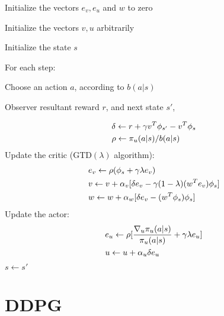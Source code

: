\documentclass[11pt,a4paper]{article}
\begin{document}
\begin{tcolorbox}[title=Off-PAC algorithm]
Initialize the vectors $e_v,e_u$ and $w$ to zero\par 
Initialize the vectors $v, u$ arbitrarily \par 
Initialize the state $s$ \par 
For each step: \par 
\hspace{1cm} Choose an action $a$, according to $b(a|s)$ \par 
\hspace{1cm} Observer resultant reward $r$, and next state $s'$, \par 
\begin{equation*}
\aligned 
& \delta \leftarrow r + \gamma v^T\phi_{s'} - v^T\phi_s \\ 
& \rho \leftarrow \pi_{u}(a|s)/b(a|s)
\endaligned
\end{equation*}
\hspace{1cm} Update the critic (GTD$(\lambda)$ algorithm):
\hspace{2cm}
\begin{equation*}
\aligned 
& e_v \leftarrow \rho(\phi_s + \gamma \lambda e_v) \\ 
& v \leftarrow v + \alpha_v [\delta e_v - \gamma(1-\lambda)(w^Te_v)\phi_s] \\ 
& w \leftarrow w + \alpha_w[\delta e_v - (w^T\phi_s)\phi_s]
\endaligned
\end{equation*}
\hspace{1cm} Update the actor:
\begin{equation*}
\aligned 
& e_u \leftarrow \rho[\frac{\nabla_u \pi_u(a|s)}{\pi_u(a|s)} + \gamma\lambda e_u] \\ 
& u \leftarrow u + \alpha_u \delta e_u
\endaligned
\end{equation*}
\hspace{1cm} $s \leftarrow s'$
\end{tcolorbox}



\section{DDPG}
\end{document}
